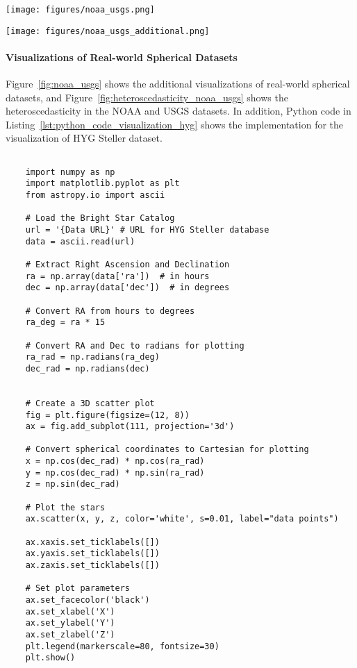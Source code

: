 \begin{figure*}[t]
    \centering
    \texttt{[image: figures/noaa\_usgs.png]}
    \caption{Visualizations for USGS Earthquake catalogue and NOAA Climate dataset.}
    \label{fig:noaa_usgs}
\end{figure*}
\begin{figure*}[t]
    \centering
    \texttt{[image: figures/noaa\_usgs\_additional.png]}
    \caption{Heteroscedasticity in the NOAA and USGS datasets.}
    \label{fig:heteroscedasticity_noaa_usgs}
\end{figure*}

\paragraph{Visualizations of Real-world Spherical Datasets}
Figure~\ref{fig:noaa_usgs} shows the additional visualizations of real-world spherical datasets, and Figure~\ref{fig:heteroscedasticity_noaa_usgs} shows the heteroscedasticity in the NOAA and USGS datasets.
In addition, Python code in Listing~\ref{lst:python_code_visualization_hyg} shows the implementation for the visualization of HYG Steller dataset.


\begin{listing}[t]
    \begin{verbatim}
    
    import numpy as np
    import matplotlib.pyplot as plt
    from astropy.io import ascii
    
    # Load the Bright Star Catalog
    url = '{Data URL}' # URL for HYG Steller database
    data = ascii.read(url)
    
    # Extract Right Ascension and Declination
    ra = np.array(data['ra'])  # in hours
    dec = np.array(data['dec'])  # in degrees
    
    # Convert RA from hours to degrees
    ra_deg = ra * 15
    
    # Convert RA and Dec to radians for plotting
    ra_rad = np.radians(ra_deg)
    dec_rad = np.radians(dec)
    
    
    # Create a 3D scatter plot
    fig = plt.figure(figsize=(12, 8))
    ax = fig.add_subplot(111, projection='3d')
    
    # Convert spherical coordinates to Cartesian for plotting
    x = np.cos(dec_rad) * np.cos(ra_rad)
    y = np.cos(dec_rad) * np.sin(ra_rad)
    z = np.sin(dec_rad)
    
    # Plot the stars
    ax.scatter(x, y, z, color='white', s=0.01, label="data points")
    
    ax.xaxis.set_ticklabels([])
    ax.yaxis.set_ticklabels([])
    ax.zaxis.set_ticklabels([])
    
    # Set plot parameters
    ax.set_facecolor('black')
    ax.set_xlabel('X')
    ax.set_ylabel('Y')
    ax.set_zlabel('Z')
    plt.legend(markerscale=80, fontsize=30)
    plt.show()
    \end{verbatim}
    \caption{Python code for the visualization of HYG Steller database.}
    \label{lst:python_code_visualization_hyg}
\end{listing}